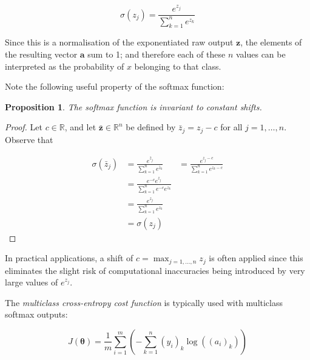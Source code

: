 \documentclass{article}[11pt]
\newtheorem{proposition}{Proposition}
\begin{document}
        $$
        \sigma(z_j) = \frac{e^{z_j}}{\sum_{k=1}^{n} e^{z_k}}
        $$
        
        Since this is a normalisation of the exponentiated raw output $\mathbf{z}$, the elements of the resulting vector $\mathbf{a}$ sum to 1; and therefore each of these $n$ values can be interpreted as the probability of $x$ belonging to that class.
        
        Note the following useful property of the softmax function: 
        
        \begin{proposition}
            
            The softmax function is invariant to constant shifts.
            
        \end{proposition}
    
        \begin{proof}
            
            Let $c \in \mathbb{R}$, and let $\mathbf{\bar{z}} \in \mathbb{R}^n$ be defined by $\bar{z}_j = z_j - c$ for all $j = 1, \ldots, n$. Observe that
            
            $$ \begin{aligned}
                \sigma(\bar{z}_j)
                &= \frac{e^{\bar{z}_j}}{\sum_{k=1}^{n} e^{\bar{z}_k}}
                &= \frac{e^{z_j - c}}{\sum_{k=1}^{n} e^{z_k - c}} \\
                &= \frac{e^{-c} e^{z_j}}{\sum_{k=1}^{n} e^{-c} e^{z_k}} \\
                &= \frac{e^{z_j}}{\sum_{k=1}^{n} e^{z_k}} \\
                &= \sigma(z_j)
            \end{aligned} $$
            
        \end{proof}
        
        In practical applications, a shift of $c = \max_{j = 1, \ldots, n} z_j$ is often applied since this eliminates the slight risk of computational inaccuracies being introduced by very large values of $e^{z_j}$.
        
        The \textit{multiclass cross-entropy cost function} is typically used with multiclass softmax outputs:
        
        $$
        J(\boldsymbol{\theta}) = \frac{1}{m} \sum_{i=1}^{m} \left( - \sum_{k=1}^{n} (y_i)_k \log((a_i)_k) \right)
        $$
        
\end{document}

